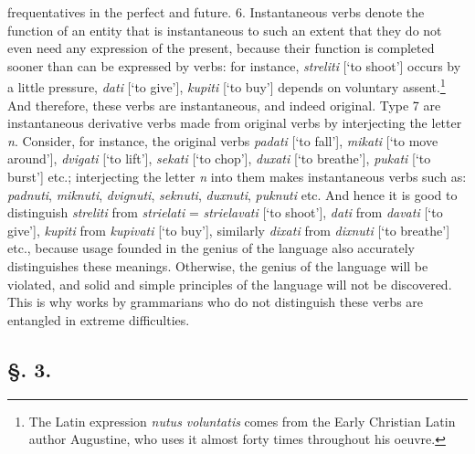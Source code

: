 frequentatives in the perfect and future. 6. Instantaneous verbs denote the function of an entity that is instantaneous to such an extent that they do not even need any expression of the present, because their function is completed sooner than can be expressed by verbs: for instance, \textit{streliti} [‘to shoot’] occurs by a little pressure, \textit{dati} [‘to give’], \textit{kupiti} [‘to buy’] depends on voluntary assent.\footnote{The Latin expression \textit{nutus voluntatis} comes from the Early Christian Latin author Augustine, who uses it almost forty times throughout his oeuvre.} And therefore, these verbs are instantaneous, and indeed original. Type 7 are instantaneous derivative verbs made from original verbs by interjecting the letter \textit{n}. Consider, for instance, the original verbs \textit{padati} [‘to fall’], \textit{mikati} [‘to move around’], \textit{dvigati} [‘to lift’], \textit{sekati} [‘to chop’], \textit{duxati} [‘to breathe’], \textit{pukati} [‘to burst’] etc.; interjecting the letter \textit{n} into them makes instantaneous verbs such as: \textit{padnuti}, \textit{miknuti}, \textit{dvignuti}, \textit{seknuti}, \textit{duxnuti}, \textit{puknuti} etc. And hence it is good to distinguish \textit{streliti} from \textit{strielati} = \textit{strielavati} [‘to shoot’], \textit{dati} from \textit{davati} [‘to give’], \textit{kupiti} from \textit{kupivati} [‘to buy’], similarly \textit{dixati} from \textit{dixnuti} [‘to breathe’] etc., because usage founded in the genius of the language also accurately distinguishes these meanings. Otherwise, the genius of the language will be violated, and solid and simple principles of the language will not be discovered. This is why works by grammarians who do not distinguish these verbs are entangled in extreme difficulties.

\subsection*{\hspace*{\fill}§. 3.\hspace*{\fill}}

